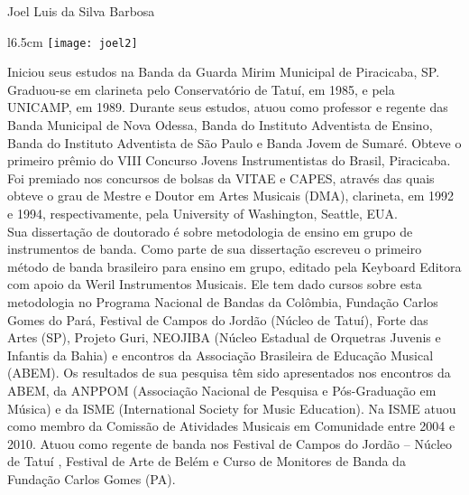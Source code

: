 
\begin{center}
 \Large{Joel Luis da Silva Barbosa}
\end{center}


\begin{wrapfigure}{l}{6.5cm}  %
  \texttt{[image: joel2]}
\end{wrapfigure}

Iniciou seus estudos na Banda da Guarda Mirim Municipal de Piracicaba,
SP. Graduou-se em clarineta pelo Conservatório de Tatuí, em 1985, e
pela UNICAMP, em 1989. Durante seus estudos, atuou como professor e
regente das Banda Municipal de Nova Odessa, Banda do Instituto
Adventista de Ensino, Banda do Instituto Adventista de São Paulo e
Banda Jovem de Sumaré. Obteve o primeiro prêmio do VIII Concurso
Jovens Instrumentistas do Brasil, Piracicaba. Foi premiado nos
concursos de bolsas da VITAE e CAPES, através das quais obteve o grau
de Mestre e Doutor em Artes Musicais (DMA), clarineta, em 1992 e 1994,
respectivamente, pela University of Washington, Seattle, EUA.  \\


Sua dissertação de doutorado é sobre metodologia de ensino em grupo de
instrumentos de banda. Como parte de sua dissertação escreveu o
primeiro método de banda brasileiro para ensino em grupo, editado pela
Keyboard Editora com apoio da Weril Instrumentos Musicais. Ele tem
dado cursos sobre esta metodologia no Programa Nacional de Bandas da
Colômbia, Fundação Carlos Gomes do Pará, Festival de Campos do Jordão
(Núcleo de Tatuí), Forte das Artes (SP), Projeto Guri, NEOJIBA (Núcleo
Estadual de Orquetras Juvenis e Infantis da Bahia) e encontros da
Associação Brasileira de Educação Musical (ABEM). Os resultados de sua
pesquisa têm sido apresentados nos encontros da ABEM, da ANPPOM
(Associação Nacional de Pesquisa e Pós-Graduação em Música) e da ISME
(International Society for Music Education). Na ISME atuou como membro
da Comissão de Atividades Musicais em Comunidade entre 2004 e
2010. Atuou como regente de banda nos Festival de Campos do Jordão –
Núcleo de Tatuí , Festival de Arte de Belém e Curso de Monitores de
Banda da Fundação Carlos Gomes (PA).  \\


